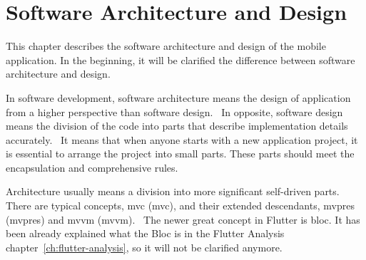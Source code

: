 \chapter{Software Architecture and Design}\label{ch:software-architecture-and-design}
This chapter describes the software architecture and design of the mobile application.
In the beginning, it will be clarified the difference between software architecture and design.

In software development, software architecture means the design of application from a higher perspective than software design.~\cite{softwareArchitecture}
In opposite, software design means the division of the code into parts that describe implementation details accurately.~\cite{softwareDesign}
It means that when anyone starts with a new application project, it is essential to arrange the project into small parts.
These parts should meet the encapsulation and comprehensive rules.

Architecture usually means a division into more significant self-driven parts.
There are typical concepts, \acrshort{mvc} (\acrlong{mvc}), and their extended descendants, \acrshort{mvpres} (\acrlong{mvpres}) and \acrshort{mvvm} (\acrlong{mvvm}).~\cite{mvc}
The newer great concept in Flutter is \acrshort{bloc}.
It has been already explained what the Bloc is in the Flutter Analysis chapter~\ref{ch:flutter-analysis}, so it will not be clarified anymore.



